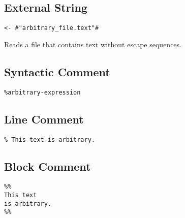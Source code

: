 \documentclass{article}
\begin{document}
\begin{multicols}
\bigskip\subsection*{External String}
\begin{lstlisting}
<- #"arbitrary_file.text"#
\end{lstlisting}
Reads a file that contains text without escape sequences.

\bigskip\subsection*{Syntactic Comment}
\begin{lstlisting}
%arbitrary-expression
\end{lstlisting}

\bigskip\subsection*{Line Comment}
\begin{lstlisting}
% This text is arbitrary.
\end{lstlisting}

\bigskip\subsection*{Block Comment}
\begin{lstlisting}
%%
This text
is arbitrary.
%%
\end{lstlisting}

\end{multicols}
\end{document}
